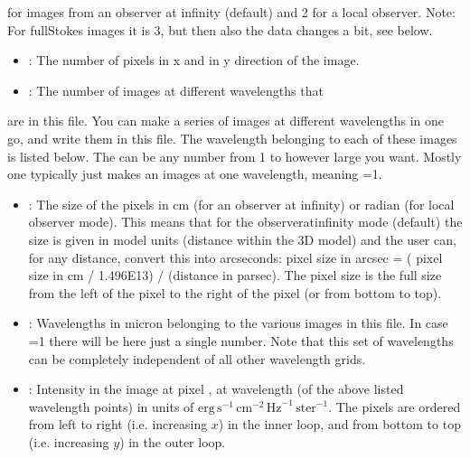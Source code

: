 \documentclass[letterpaper,10pt,english]{sphinxmanual}
\begin{document}
for images from an observer at infinity (default) and 2 for a local observer.
Note: For full\sphinxhyphen{}Stokes images it is 3, but then also the data changes a
bit, see below.
\begin{itemize}
\item {} 
: The number of pixels in x and in y
direction of the image.

\item {} 
: The number of images at different wavelengths that

\end{itemize}

are in this file. You can make a series of images at different wavelengths
in one go, and write them in this file. The wavelength belonging to each of
these images is listed below. The  can be any number from 1 to
however large you want. Mostly one typically just makes an images at one
wavelength, meaning =1.
\begin{itemize}
\item {} 
: The size of the pixels in cm (for an observer at
infinity) or radian (for local observer mode).  This means that for the
observer\sphinxhyphen{}at\sphinxhyphen{}infinity mode (default) the size is given in model units (distance
within the 3\sphinxhyphen{}D model) and the user can, for any distance, convert this into
arcseconds: pixel size in arcsec = ( pixel size in cm / 1.496E13) / (distance
in parsec). The pixel size is the full size from the left of the pixel to the
right of the pixel (or from bottom to top).

\item {} 
: Wavelengths in micron belonging to the various images in this
file. In case =1 there will be here just a single number. Note that
this set of wavelengths can be completely independent of all other wavelength
grids.

\item {} 
: Intensity in the image at pixel ,  at
wavelength  (of the above listed wavelength points) in units of
\(\mathrm{erg}\,\mathrm{s}^{-1}\,\mathrm{cm}^{-2}\,\mathrm{Hz}^{-1}\,\mathrm{ster}^{-1}\).
The pixels are ordered from left to right (i.e. increasing \(x\)) in the
inner loop, and from bottom to top (i.e. increasing \(y\)) in the outer
loop.

\end{itemize}
\end{document}
